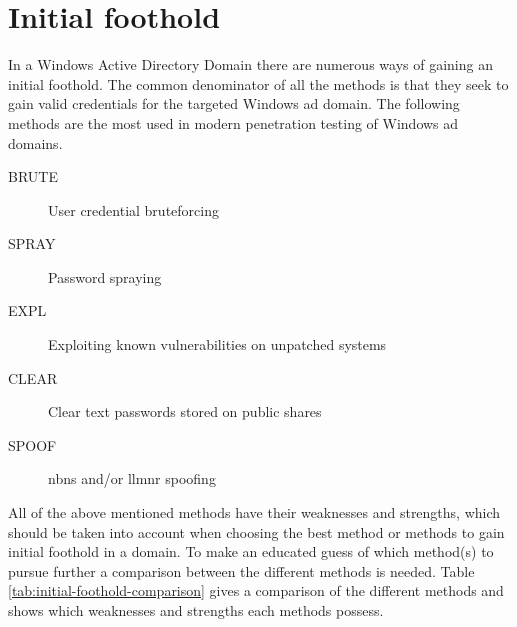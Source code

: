 \documentclass{article}
\begin{document}
\section{Initial foothold}
\label{sec:initial-foothold}
In a Windows Active Directory Domain there are numerous ways of gaining an initial foothold. The common denominator of all the methods is that they seek to gain valid credentials for the targeted Windows \gls{ad} domain. The following methods are the most used in modern penetration testing of Windows \gls{ad} domains.
\begin{description}
	\item[BRUTE] User credential bruteforcing
	\item[SPRAY] Password spraying
	\item[EXPL]Exploiting known vulnerabilities on unpatched systems
	\item[CLEAR] Clear text passwords stored on public shares
	\item[SPOOF] \gls{nbns} and/or \gls{llmnr} spoofing
\end{description}

All of the above mentioned methods have their weaknesses and strengths, which should be taken into account when choosing the best method or methods to gain initial foothold in a domain. To make an educated guess of which method(s) to pursue further a comparison between the different methods is needed. Table \ref{tab:initial-foothold-comparison} gives a comparison of the different methods and shows which weaknesses and strengths each methods possess.
\end{document}
